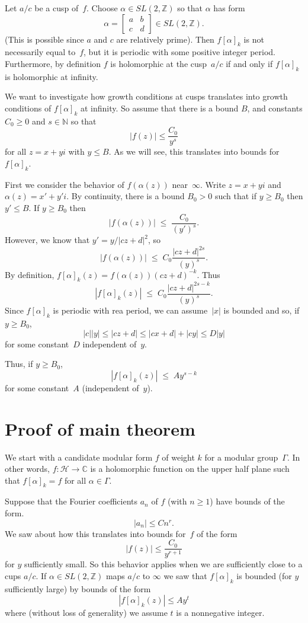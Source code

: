 \documentclass {amsart}
\theoremstyle{plain}
\theoremstyle{definition}
\theoremstyle{remark}
\newcommand{\bN}{{\mathbb{N}}}
\newcommand{\bZ}{{\mathbb{Z}}}
\newcommand{\bC}{{\mathbb{C}}}
\newcommand{\h}{{\mathcal{H}}}
\begin{document}
Let $a/c$ be a cusp
of~$f$. 
Choose $\alpha \in SL(2, \bZ)$ so that $\alpha$ has form
$$ \alpha = \begin{bmatrix}
       a & b         \\
       c & d
 \end{bmatrix}  \in SL (2, \bZ).$$
 (This is possible since $a$ and $c$ are relatively prime).
 Then $f [\alpha]_k$ is not necessarily equal to~$f$, but it is periodic with
 some positive integer period. Furthermore, by definition $f$ is holomorphic at 
 the cusp~$a/c$ if and only if $f [\alpha]_k$ is holomorphic at infinity.

We want to investigate how growth conditions at cusps translates into growth conditions
of $f [\alpha]_k$ at infinity. So  assume that there is a bound $B$, and constants $C_0 \ge 0$
and $s \in \bN$ so that
$$
|f(z)|  \le \frac{C_0}{y^{s}}
$$
for all $z = x + yi$ with $y \le B$.
As we will see, this translates into bounds for $f [\alpha]_k$.


First we consider the behavior of $f(\alpha(z))$ near~$\infty$. Write $z = x + y i$
and $\alpha(z) = x' + y' i$.
By continuity, there is a bound $B_0 > 0$ such that if $y \ge B_0$ then $y' \le B$.
If $y \ge B_0$ then
$$
|f(\alpha(z))|  \; \le \; \frac{C_0}{(y')^{s}}.
$$
However, we know that $y' = y / |c z + d|^2$, so
$$
|f(\alpha(z))|  \; \le \; C_0  \frac{ |c z + d|^{2 s}}{(y)^{s}}.
$$
By definition, $f [\alpha]_k (z) = f(\alpha (z)) (c z + d)^{-k}$.
Thus
$$
\left| f [\alpha]_k (z) \right|  \; \le \; C_0  \frac{ |c z + d|^{2 s - k}}{(y)^{s}}.
$$
Since $ f [\alpha]_k $ is periodic with rea period, we can assume~$|x|$
is bounded and so, if $y \ge B_0$,
$$|c| |y| \le |c z + d| \le |c x + d| + |c y| \le D |y|$$
for some constant~$D$ independent of~$y$. 

Thus, if $y \ge B_0$, 
$$
\left| f [\alpha]_k (z) \right|  \; \le \; A  y ^{s-k}
$$
for some constant~$A$ (independent of~$y$).


\section {Proof of main theorem}

We start with a candidate modular form $f$ 
of weight $k$ for a modular group~$\Gamma$.
In other words, 
$f: \h \to \bC$ is a holomorphic function on the upper half plane 
such that $f [\alpha]_k = f$ for all $\alpha \in\Gamma$. 

Suppose that the Fourier coefficients $a_n$ of $f$ (with $n\ge 1$) have 
bounds of the form.
$$
|a_n| \le C n^r.
$$
We saw about how this translates into bounds for~$f$ of the form
$$
|f(z)| \le \frac{C_0}{y^{r+1}}
$$
for $y$ sufficiently small. So this behavior applies when we are sufficiently
close to a cups $a/c$.  If $\alpha \in SL(2, \bZ)$ maps $a/c$ to $\infty$
we saw that $f [\alpha]_k$ is bounded (for $y$ sufficiently large) by bounds of the form
$$
|f [\alpha]_k (z)| \le A y^t
$$
where (without loss of generality) we assume $t$ is a nonnegative integer.
\end{document}

